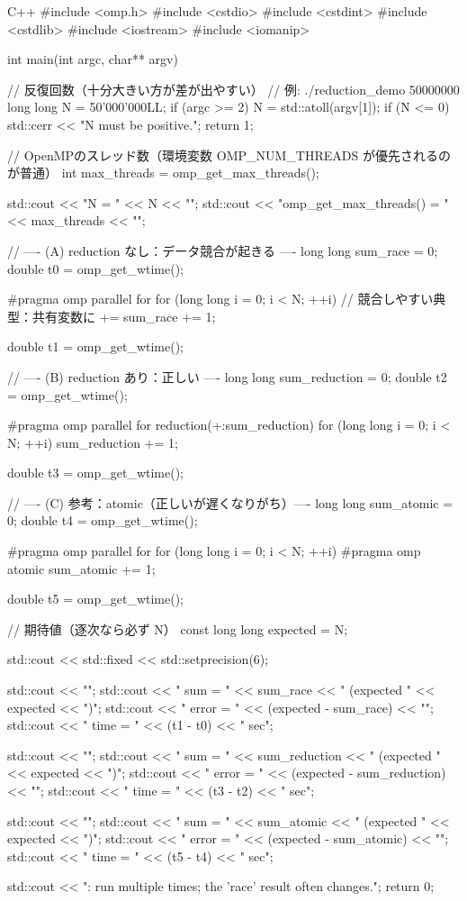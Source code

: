 \documentclass[12pt]{jreport}
\begin{document}
\begin{codebox}{C++}
#include <omp.h>
#include <cstdio>
#include <cstdint>
#include <cstdlib>
#include <iostream>
#include <iomanip>

int main(int argc, char** argv) {
    // 反復回数（十分大きい方が差が出やすい）
    // 例: ./reduction_demo 50000000
    long long N = 50'000'000LL;
    if (argc >= 2) {
        N = std::atoll(argv[1]);
        if (N <= 0) {
            std::cerr << "N must be positive.\n";
            return 1;
        }
    }

    // OpenMPのスレッド数（環境変数 OMP_NUM_THREADS が優先されるのが普通）
    int max_threads = omp_get_max_threads();

    std::cout << "N = " << N << "\n";
    std::cout << "omp_get_max_threads() = " << max_threads << "\n";

    // ---- (A) reduction なし：データ競合が起きる ----
    long long sum_race = 0;
    double t0 = omp_get_wtime();

#pragma omp parallel for
    for (long long i = 0; i < N; ++i) {
        // 競合しやすい典型：共有変数に +=
        sum_race += 1;
    }

    double t1 = omp_get_wtime();

    // ---- (B) reduction あり：正しい ----
    long long sum_reduction = 0;
    double t2 = omp_get_wtime();

#pragma omp parallel for reduction(+:sum_reduction)
    for (long long i = 0; i < N; ++i) {
        sum_reduction += 1;
    }

    double t3 = omp_get_wtime();

    // ---- (C) 参考：atomic（正しいが遅くなりがち）----
    long long sum_atomic = 0;
    double t4 = omp_get_wtime();

#pragma omp parallel for
    for (long long i = 0; i < N; ++i) {
#pragma omp atomic
        sum_atomic += 1;
    }

    double t5 = omp_get_wtime();

    // 期待値（逐次なら必ず N）
    const long long expected = N;

    std::cout << std::fixed << std::setprecision(6);

    std::cout << "\n";
    std::cout << "  sum = " << sum_race << " (expected " << expected << ")\n";
    std::cout << "  error = " << (expected - sum_race) << "\n";
    std::cout << "  time = " << (t1 - t0) << " sec\n";

    std::cout << "\n[Reduction]\n";
    std::cout << "  sum = " << sum_reduction << " (expected " << expected << ")\n";
    std::cout << "  error = " << (expected - sum_reduction) << "\n";
    std::cout << "  time = " << (t3 - t2) << " sec\n";

    std::cout << "\n";
    std::cout << "  sum = " << sum_atomic << " (expected " << expected << ")\n";
    std::cout << "  error = " << (expected - sum_atomic) << "\n";
    std::cout << "  time = " << (t5 - t4) << " sec\n";

    std::cout << "\nTip: run multiple times; the 'race' result often changes.\n";
    return 0;
}
\end{codebox}
\end{document}
